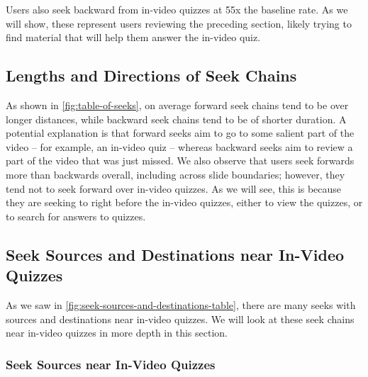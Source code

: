 \documentclass{sigchi}
\begin{document}
Users also seek backward from in-video quizzes at 55x the baseline rate. As we will show, these represent users reviewing the preceding section, likely trying to find material that will help them answer the in-video quiz. %





\subsection{Lengths and Directions of Seek Chains}

As shown in \autoref{fig:table-of-seeks}, on average forward seek chains tend to be over longer distances, while backward seek chains tend to be of shorter duration. A potential explanation is that forward seeks aim to go to some salient part of the video -- for example, an in-video quiz -- whereas backward seeks aim to review a part of the video that was just missed. We also observe that users seek forwards more than backwards overall, including across slide boundaries; however, they tend not to seek forward over in-video quizzes. As we will see, this is because they are seeking to right before the in-video quizzes, either to view the quizzes, or to search for answers to quizzes. %

\subsection{Seek Sources and Destinations near In-Video Quizzes}

As we saw in \autoref{fig:seek-sources-and-destinations-table}, there are many seeks with sources and destinations near in-video quizzes. We will look at these seek chains near in-video quizzes in more depth in this section.

\subsubsection{Seek Sources near In-Video Quizzes}
\end{document}
